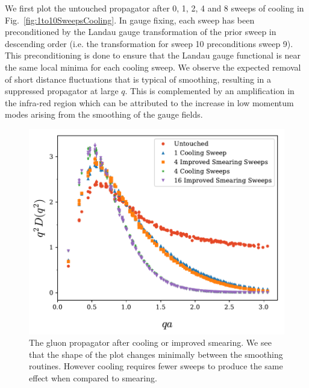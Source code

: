 We first plot the untouched propagator after 0, 1, 2, 4 and 8 sweeps of cooling in Fig.~\ref{fig:1to10SweepsCooling}. In gauge fixing, each sweep has been preconditioned by the Landau gauge transformation of the prior sweep in descending order (i.e. the transformation for sweep 10 preconditions sweep 9). This preconditioning is done to ensure that the Landau gauge functional is near the same local minima for each cooling sweep. We observe the expected removal of short distance fluctuations that is typical of smoothing, resulting in a suppressed propagator at large $q$. This is complemented by an amplification in the infra-red region which can be attributed to the increase in low momentum modes arising from the smoothing of the gauge fields.\\
%
\begin{figure}[tb]
\centering
\includegraphics[width=\linewidth]{./ScalarGluComp_q2_SmearCoolComp.pdf}
\caption{\label{fig:SmearCoolComp}The gluon propagator after cooling or improved smearing. We see that the shape of the plot changes minimally between the smoothing routines. However cooling requires fewer sweeps to produce the same effect when compared to smearing.}
\end{figure}
%


